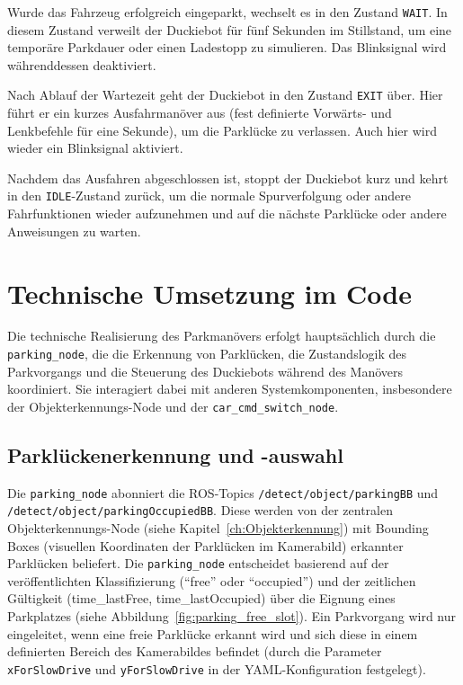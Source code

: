 Wurde das Fahrzeug erfolgreich eingeparkt, wechselt es in den Zustand \texttt{WAIT}. In diesem Zustand verweilt der Duckiebot für fünf Sekunden im Stillstand, um eine temporäre Parkdauer oder einen Ladestopp zu simulieren. Das Blinksignal wird währenddessen deaktiviert.

Nach Ablauf der Wartezeit geht der Duckiebot in den Zustand \texttt{EXIT} über. Hier führt er ein kurzes Ausfahrmanöver aus (fest definierte Vorwärts- und Lenkbefehle für eine Sekunde), um die Parklücke zu verlassen. Auch hier wird wieder ein Blinksignal aktiviert.

Nachdem das Ausfahren abgeschlossen ist, stoppt der Duckiebot kurz und kehrt in den \texttt{IDLE}-Zustand zurück, um die normale Spurverfolgung oder andere Fahrfunktionen wieder aufzunehmen und auf die nächste Parklücke oder andere Anweisungen zu warten.




\section{Technische Umsetzung im Code}
Die technische Realisierung des Parkmanövers erfolgt hauptsächlich durch die \texttt{parking\_node}, die die Erkennung von Parklücken, die Zustandslogik des Parkvorgangs und die Steuerung des Duckiebots während des Manövers koordiniert. Sie interagiert dabei mit anderen Systemkomponenten, insbesondere der Objekterkennungs-Node und der \texttt{car\_cmd\_switch\_node}.


\subsection{Parklückenerkennung und -auswahl}
Die \texttt{parking\_node} abonniert die \ac{ROS}-Topics \texttt{/detect/object/parkingBB} und \texttt{/detect/object/parkingOccupiedBB}. 
Diese werden von der zentralen Objekterkennungs-Node (siehe Kapitel~\ref{ch:Objekterkennung}) mit Bounding Boxes (visuellen Koordinaten der Parklücken im Kamerabild) erkannter Parklücken beliefert.
Die \texttt{parking\_node} entscheidet basierend auf der veröffentlichten Klassifizierung (\enquote{free} oder \enquote{occupied}) und der zeitlichen Gültigkeit (time\_lastFree, time\_lastOccupied) über die Eignung eines Parkplatzes (siehe Abbildung~\ref{fig:parking_free_slot}). Ein Parkvorgang wird nur eingeleitet, wenn eine freie Parklücke erkannt wird und sich diese in einem definierten Bereich des Kamerabildes befindet (durch die Parameter \texttt{xForSlowDrive} und \texttt{yForSlowDrive} in der YAML-Konfiguration festgelegt).

